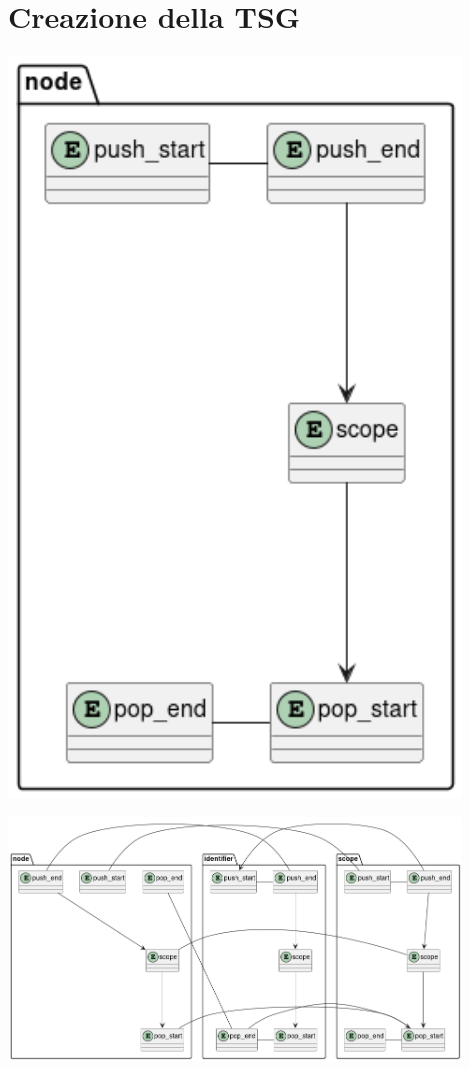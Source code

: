 \chapter{Creazione della TSG}

    \begin{center}
        \includegraphics[width=12cm]{identifier.png}
    \end{center}
    \begin{center}
        \includegraphics[width=12cm]{scoped_identifier_1.png}
    \end{center}
